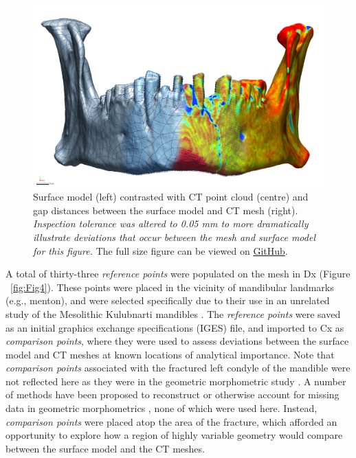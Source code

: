 \documentclass[review]{elsarticle}
\begin{document}
\begin{figure}[ht]\centering
\includegraphics[width=\linewidth]{Fig2}
\caption{Surface model (left) contrasted with CT point cloud (centre) and gap distances between the surface model and CT mesh (right). \textit{Inspection tolerance was altered to 0.05 mm to more dramatically illustrate deviations that occur between the mesh and surface model for this figure.} The full size figure can be viewed on \href{https://github.com/aksel-blaise/cai.mandible/blob/main/figures/Fig2.jpg}{GitHub}.}
\label{fig:Fig1x}
\end{figure}

A total of thirty-three \textit{reference points} were populated on the mesh in Dx (Figure ~\ref{fig:Fig4}). These points were placed in the vicinity of mandibular landmarks (e.g., menton), and were selected specifically due to their use in an unrelated study of the Mesolithic Kulubnarti mandibles \citep{RN11477}. The \textit{reference points} were saved as an initial graphics exchange specifications (IGES) file, and imported to Cx as \textit{comparison points}, where they were used to assess deviations between the surface model and CT meshes at known locations of analytical importance. Note that \textit{comparison points} associated with the fractured left condyle of the mandible were not reflected here as they were in the geometric morphometric study \citep{RN11477}. A number of methods have been proposed to reconstruct \citep{RN11496,RN11501} or otherwise account for missing data in geometric morphometrics \citep{RN11500,RN11497,RN11498,RN11499,RN5928}, none of which were used here. Instead, \textit{comparison points} were placed atop the area of the fracture, which afforded an opportunity to explore how a region of highly variable geometry would compare between the surface model and the CT meshes.
\end{document}
